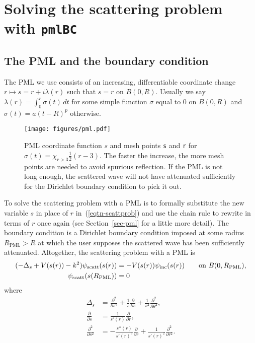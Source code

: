 \section{Solving the scattering problem with {\tt pmlBC}}
\label{sec-pmlBC}

\subsection{The PML and the boundary condition}
\label{sec-pmlBC-BC}

The PML we use consists of an increasing, differentiable coordinate change
$r \mapsto s = r + i \lambda(r)$ such that $s = r$ on $B(0,R)$.
Usually we say $\lambda(r) = \int_0^r \sigma(t)\,dt$ for some
simple function $\sigma$ equal to 0 on $B(0,R)$ and
$\sigma(t) = a(t-R)^p$ otherwise.
\begin{figure}[h]
 \centering
 \texttt{[image: figures/pml.pdf]}
 \caption{PML coordinate function $s$ and mesh points
         {\tt s} and {\tt r} for
	 $\sigma(t) = \chi_{r > 3} \frac{1}{2}(r-3)$.
         The faster the increase, the more mesh points
	 are needed to avoid spurious reflection.
         If the PML is not long
         enough, the scattered wave will not have attenuated
         sufficiently for the Dirichlet boundary condition to
	 pick it out.}
\end{figure}

To solve the scattering problem with a PML is to formally substitute
the new variable $s$ in place of $r$ in~(\ref{eqtn-scattprob})
and use the chain rule to rewrite in terms of $r$ once again
(see Section~\ref{sec-pml} for a little more detail).
The boundary condition is
a Dirichlet boundary condition imposed at some radius
$R_{\text{PML}} > R$ at which the user supposes the scattered wave
has been sufficiently attenuated. Altogether, the scattering problem with
a PML is
\begin{equation}\label{eqtn-pmlscattprob}
\begin{aligned}
(-\Delta_s + V(s(r)) - k^2)\psi_{\text{scatt}}(s(r)) &= -V(s(r))\psi_{\text{inc}}(s(r))
    \qquad \text{on } B(0,R_{\text{PML}}), \\
    \psi_{\text{scatt}}(s(R_{\text{PML}})) &= 0
    \end{aligned}
\end{equation}
where
\begin{equation}\label{eqtn-pmllaplacian}
\begin{aligned}
\Delta_s &= \frac{\partial^2}{\partial s^2} +
\frac{1}{s}\frac{\partial}{\partial s} +
\frac{1}{s^2}\frac{\partial^2}{\partial\theta^2}, \\
				  \frac{\partial}{\partial s}
&= \frac{1}{s'(r)}\frac{\partial}{\partial r}, \\
 \frac{\partial^2}{\partial s^2}
          &= -\frac{s''(r)}{s'(r)^3} \frac{\partial}{\partial r}
+\frac{1}{s'(r)^2} \frac{\partial^2}{\partial r^2}.
\end{aligned}
\end{equation}

